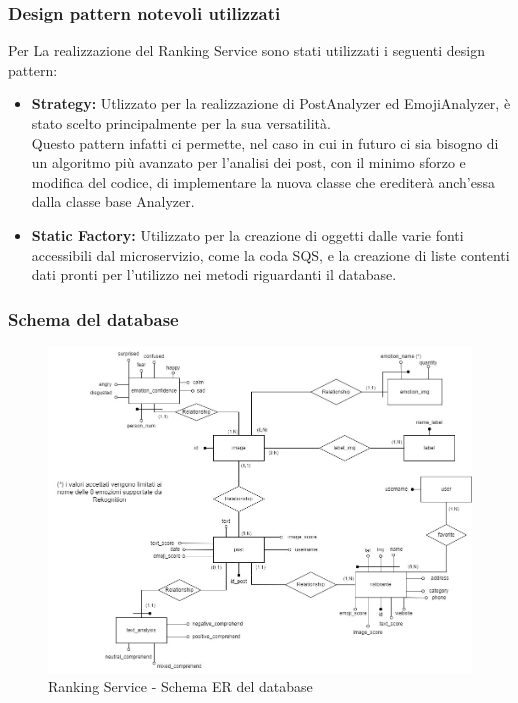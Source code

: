 \subsubsection{Design pattern notevoli utilizzati}
Per La realizzazione del Ranking Service sono stati utilizzati i seguenti design pattern:
\begin{itemize}
    \item \textbf{Strategy:} Utlizzato per la realizzazione di PostAnalyzer ed EmojiAnalyzer, è stato scelto principalmente per la sua versatilità.\\
    Questo pattern infatti ci permette, nel caso in cui in futuro ci sia bisogno di un algoritmo più avanzato per l'analisi dei post, con il minimo sforzo e modifica del codice, di implementare la nuova classe che erediterà anch'essa dalla classe base Analyzer.
    \item \textbf{Static Factory:} Utilizzato per la creazione di oggetti dalle varie fonti accessibili dal microservizio, come la coda SQS, e la creazione di liste contenti dati pronti per l'utilizzo nei metodi riguardanti il database.
\end{itemize}

\subsubsection{Schema del database}
\begin{figure}[h]
    \centering
    \includegraphics[scale=0.35]{Contenuto/Immagini/ER-RS.jpg}
    \caption{Ranking Service - Schema ER del database}
\end{figure}